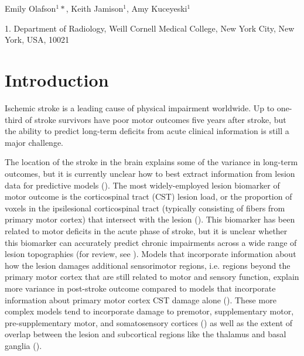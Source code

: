 \documentclass[10pt]{article}
\begin{document}
 

{\large \section*{}}
\begin{center}
Emily Olafson$^1*$, Keith Jamison$^1$, Amy Kuceyeski$^1$
\end{center}

    1. \textmd{Department of Radiology, Weill Cornell Medical College, New York City, New York, USA, 10021} 


\section{Introduction}
Ischemic stroke is a leading cause of physical impairment worldwide. Up to one-third of stroke survivors have poor motor outcomes five years after stroke, but the ability to predict long-term deficits from acute clinical information is still a major challenge.

The location of the stroke in the brain explains some of the variance in long-term outcomes, but it is currently unclear how to best extract information from lesion data for predictive models (\cite{Sperber2020-kp, Kasties2021-rm}). The most widely-employed lesion biomarker of motor outcome is the corticospinal tract (CST) lesion load, or the proportion of voxels in the ipsilesional corticospinal tract (typically consisting of fibers from primary motor cortex) that intersect with the lesion (\cite{Zhu2010-qh, Feng2015-du}). This biomarker has been related to motor deficits in the acute phase of stroke, but it is unclear whether this biomarker can accurately predict chronic impairments across a wide range of lesion topographies (for review, see \cite{Kim2017-xe}). 
Models that incorporate information about how the lesion damages additional sensorimotor regions, i.e. regions beyond the primary motor cortex that are still related to motor and sensory function, explain more variance in post-stroke outcome compared to models that incorporate information about primary motor cortex CST damage alone (\cite{Ito2022-em, Sperber2021-lw, Rondina2016-ds, Rondina2017-ij, Schulz2012-yy}). These more complex models tend to incorporate damage to premotor, supplementary motor, pre-supplementary motor, and somatosensory cortices (\cite{Ito2022-em,Schulz2012-yy, Sperber2021-lw}) as well as the extent of overlap between the lesion and subcortical regions like the thalamus and basal ganglia (\cite{Rondina2016-ds, Rondina2017-ij}). 
\end{document}
